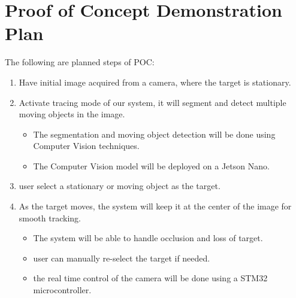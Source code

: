 \documentclass{article}
\begin{document}

\section{Proof of Concept Demonstration Plan}

The following are planned steps of POC:

\begin{enumerate}
  \item Have initial image acquired from a camera, where the target is stationary.
  \item Activate tracing mode of our system, it will segment and detect multiple moving
        objects in the image.
        \begin{itemize}
          \item The segmentation and moving object detection will be done using Computer Vision
                techniques.
          \item The Computer Vision model will be deployed on a Jetson Nano.
        \end{itemize}
  \item user select a stationary or moving object as the target.
  \item As the target moves, the system will keep it at the center of the image for
        smooth tracking.
        \begin{itemize}
          \item The system will be able to handle occlusion and loss of target.
          \item user can manually re-select the target if needed.
          \item the real time control of the camera will be done using a STM32 microcontroller.
        \end{itemize}
\end{enumerate}
\end{document}
